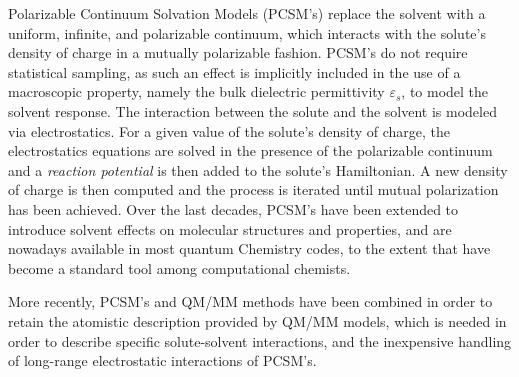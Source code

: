 Polarizable Continuum Solvation Models\cite{MST,ReviewPCM_1994,ReviewPCM_2005,Orozco_CR_Solvent00,Klamt:2011we,Mennucci:2012ct,honig1995cla,Roux:1999vp} (PCSM's) replace the solvent with a uniform, infinite, and polarizable continuum, which interacts with the solute's density of charge in a mutually polarizable fashion. PCSM's do not require statistical sampling, as such an effect is implicitly included in the use of a macroscopic property, namely the bulk dielectric permittivity $\varepsilon_s$, to model the solvent response. The interaction between the solute and the solvent is modeled via electrostatics. For a given value of the solute's density of charge, the electrostatics equations are solved in the presence of the polarizable continuum and a \emph{reaction potential} is then added to the solute's Hamiltonian. A new density of charge is then computed and the process is iterated until mutual polarization has been achieved\cite{ReviewPCM_2005,Lipparini_JCP_VPCM,Lipparini_JCTC_VPCMSCF,Lipparini_JCP_Perspective}.
Over the last decades, PCSM's have been extended to introduce solvent effects on molecular structures and properties\cite{Tomasi_PCCP_PCMProps,Mennucci_Chir_PCMProps,Mennucci_JPCL_PCM}, and are nowadays available in most quantum Chemistry codes, to the extent that have become a standard tool among computational chemists. 

More recently, PCSM's and QM/MM methods have been combined\cite{Pedone_CPC_QMMMPCM,Rega_JACS_QMMMPCM,Vreven_JCP_OniomPCM,Bandyopadhyay2002,Lipparini_JCTC_FQPCM,Caprasecca_JCTC_FMM,Steindal_JCPA_QMMMPCM,Boulanger_JCTC_QMMMPolPCM,Caprasecca_JCTC_QMMMPolPCM} in order to retain the atomistic description provided by QM/MM models, which is needed in order to describe specific solute-solvent interactions, and the inexpensive handling of long-range electrostatic interactions of PCSM's.

